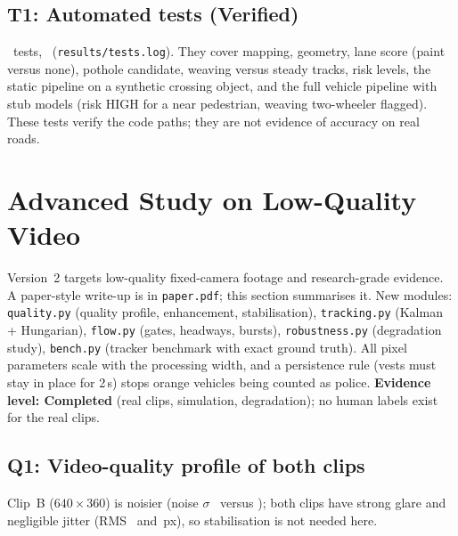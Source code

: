 \documentclass[11pt,a4paper]{article}
\begin{document}
\subsection*{T1: Automated tests (Verified)}
\mTests\ tests, \mTestsStatus\ (\texttt{results/tests.log}). They cover mapping, geometry, lane score (paint versus none), pothole candidate, weaving versus steady
tracks, risk levels, the static pipeline on a synthetic crossing object, and the full vehicle pipeline with stub models (risk HIGH for a near pedestrian, weaving
two-wheeler flagged). These tests verify the code paths; they are not evidence of accuracy on real roads.

\section{Advanced Study on Low-Quality Video}\label{sec:advanced}
Version~2 targets low-quality fixed-camera footage and research-grade evidence. A paper-style write-up is in \texttt{paper.pdf}; this section summarises it.
New modules: \texttt{quality.py} (quality profile, enhancement, stabilisation), \texttt{tracking.py} (Kalman + Hungarian), \texttt{flow.py} (gates, headways, bursts),
\texttt{robustness.py} (degradation study), \texttt{bench.py} (tracker benchmark with exact ground truth). All pixel parameters scale with the processing width, and a persistence rule
(vests must stay in place for 2\,s) stops orange vehicles being counted as police. \textbf{Evidence level: Completed} (real clips, simulation, degradation); no human labels exist for the real clips.

\subsection*{Q1: Video-quality profile of both clips}
\begin{table}[H]
\centering
\caption{Quality profile (sharpness is scene-dependent).}
\small
\resizebox{0.9\textwidth}{!}{}
\end{table}
Clip~B ($640\times360$) is noisier (noise $\sigma$ \mQBNoise\ versus \mQANoise); both clips have strong glare and negligible jitter (RMS \mQBJitter\ and \mQAJitter\,px), so stabilisation is not needed here.
\end{document}
